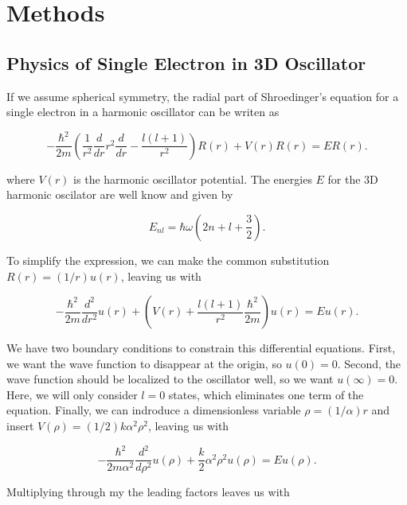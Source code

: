 \documentclass[%
oneside,                 %
final,                   %
10pt]{article}
\begin{document}
\section{Methods}

\subsection{Physics of Single Electron in 3D Oscillator}

If we assume spherical symmetry, the radial part of Shroedinger's equation for a single electron in a harmonic oscillator can be writen as

\begin{equation*}
  -\frac{\hbar^2}{2 m} \left ( \frac{1}{r^2} \frac{d}{dr} r^2
  \frac{d}{dr} - \frac{l (l + 1)}{r^2} \right )R(r) 
     + V(r) R(r) = E R(r).
\end{equation*}

where $V(r)$ is the harmonic oscillator potential.  The energies $E$ for the 3D harmonic oscilator are well know and given by

\begin{equation*}
E_{nl}=  \hbar \omega \left(2n+l+\frac{3}{2}\right).
\end{equation*}

To simplify the expression, we can make the common substitution $R(r) = (1/r) u(r)$, leaving us with
% 

\begin{equation*}
  -\frac{\hbar^2}{2 m} \frac{d^2}{dr^2} u(r) 
       + \left ( V(r) + \frac{l (l + 1)}{r^2}\frac{\hbar^2}{2 m}
                                    \right ) u(r)  = E u(r) .
\end{equation*}
% 

We have two boundary conditions to constrain this differential equations.  First, we want the wave function to disappear at the origin, so $u(0)=0$.  Second, the wave function should be localized to the oscillator well, so we want $u(\infty)=0$.  Here, we will only consider $l=0$ states, which eliminates one term of the equation.  Finally, we can indroduce a dimensionless variable $\rho = (1/\alpha) r$ and insert  $V(\rho) = (1/2) k \alpha^2\rho^2$, leaving us with

\begin{equation*}
  -\frac{\hbar^2}{2 m \alpha^2} \frac{d^2}{d\rho^2} u(\rho) 
       + \frac{k}{2} \alpha^2\rho^2u(\rho)  = E u(\rho) .
\end{equation*}

Multiplying through my the leading factors leaves us with
\end{document}
